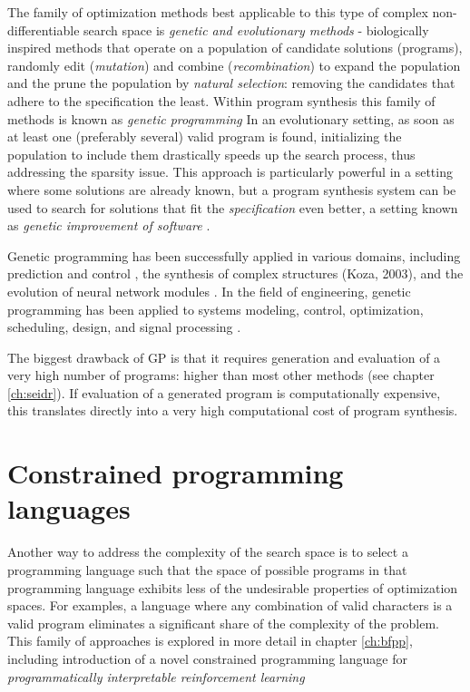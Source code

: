 The family of optimization methods best applicable to this type of complex non-differentiable search space is \emph{genetic and evolutionary methods} - biologically inspired methods that operate on a population of candidate solutions (programs), randomly edit (\emph{mutation}) and combine (\emph{recombination}) to expand the population and the prune the population by \emph{natural selection}: removing the candidates that adhere to the specification the least.
Within program synthesis this family of methods is known as \emph{genetic programming} \cite{genprog1, genprog2, genprogast}
In an evolutionary setting, as soon as at least one (preferably several) valid program is found, initializing the population to include them drastically speeds up the search process, thus addressing the sparsity issue.
This approach is particularly powerful in a setting where some solutions are already known, but a program synthesis system can be used to search for solutions that fit the \emph{specification} even better, a setting known as \emph{genetic improvement of software} \cite{petke2018:genetic}.

Genetic programming has been successfully applied in various domains, including prediction and control \cite{dracopoulosGeneticProgrammingPrediction1997}, the synthesis of complex structures (Koza, 2003), and the evolution of neural network modules \cite{degarisGENETICPROGRAMMING1990}. In the field of engineering, genetic programming has been applied to systems modeling, control, optimization, scheduling, design, and signal processing \cite{willisGeneticProgrammingIntroduction1997}. 

The biggest drawback of GP is that it requires generation and evaluation of a very high number of programs: higher than most other methods (see chapter \ref{ch:seidr}).
If evaluation of a generated program is computationally expensive, this translates directly into a very high computational cost of program synthesis.

\newpage
\section{Constrained programming languages}
\label{sec:constrainedpl}

Another way to address the complexity of the search space is to select a programming language such that the space of possible programs in that programming language exhibits less of the undesirable properties of optimization spaces.
For examples, a language where any combination of valid characters is a valid program \cite{brainfuck} eliminates a significant share of the complexity of the problem.
This family of approaches is explored in more detail in chapter \ref{ch:bfpp}, including  introduction of a novel constrained programming language for \emph{programmatically interpretable reinforcement learning}

